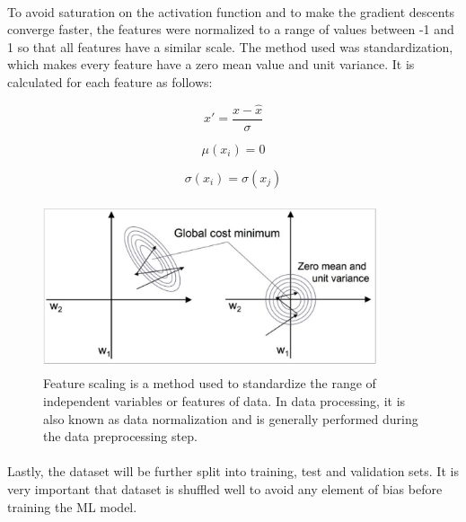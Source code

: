 \documentclass{llncs}       %
\begin{document}
\paragraph{}

To avoid saturation on the activation function and to make the gradient descents converge faster, the features were normalized to a range of values between -1 and 1 so that all features have a similar scale. The method used was standardization, which makes every feature have a zero mean value and unit variance. It is calculated for each feature as follows:


\begin{equation} 
x'=\frac{x-\hat{x}}{\sigma}
\end{equation}

\begin{equation}
\mu (x_{i})= 0   
\end{equation}

\begin{equation} 
\sigma (x_{i}) = \sigma(x_{j})
\end{equation}


\begin{figure}[h]
\centering
\includegraphics[width=9.81cm,height=5.00cm]{media/image7.eps}
\caption{Feature scaling is a method used to standardize the 
range of independent variables or features of data. In data processing, 
it is also known as data normalization and is generally performed during 
the data preprocessing step.}
\end{figure}

\paragraph{}
Lastly, the dataset will be further split into training, test and validation sets. It is very important that dataset is shuffled well to avoid any element of bias before training the ML model. 

\paragraph{}
\end{document}
